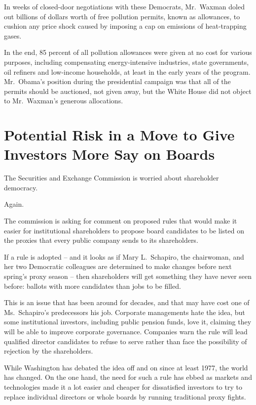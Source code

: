 \documentclass[12pt,a4paper,onecolumn]{article}
\begin{document}
In weeks of closed-door negotiations with these Democrats, Mr.~Waxman doled out billions of dollars
worth of free pollution permits, known as allowances, to cushion any price shock caused by imposing
a cap on emissions of heat-trapping gases.

In the end, 85 percent of all pollution allowances were given at no cost for various purposes,
including compensating energy-intensive industries, state governments, oil refiners and low-income
households, at least in the early years of the program. Mr.~Obama's position during the presidential
campaign was that all of the permits should be auctioned, not given away, but the White House did
not object to Mr.~Waxman's generous allocations.


\section{Potential Risk in a Move to Give Investors More Say on Boards}

The Securities and Exchange Commission is worried about shareholder democracy.

Again.

The commission is asking for comment on proposed rules that would make it easier for institutional
shareholders to propose board candidates to be listed on the proxies that every public company sends
to its shareholders.

If a rule is adopted -- and it looks as if Mary L.~Schapiro, the chairwoman, and her two Democratic
colleagues are determined to make changes before next spring's proxy season -- then shareholders
will get something they have never seen before: ballots with more candidates than jobs to be filled.

This is an issue that has been around for decades, and that may have cost one of Ms.~Schapiro's
predecessors his job. Corporate managements hate the idea, but some institutional investors,
including public pension funds, love it, claiming they will be able to improve corporate governance.
Companies warn the rule will lead qualified director candidates to refuse to serve rather than face
the possibility of rejection by the shareholders.

While Washington has debated the idea off and on since at least 1977, the world has changed. On the
one hand, the need for such a rule has ebbed as markets and technologies made it a lot easier and
cheaper for dissatisfied investors to try to replace individual directors or whole boards by running
traditional proxy fights.
\end{document}
